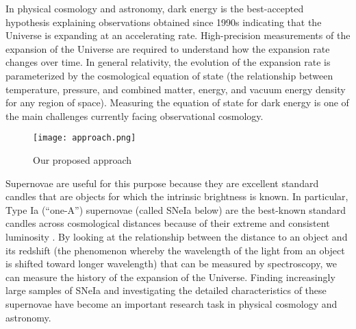\documentclass[conference,compsoc]{IEEEtran}
\begin{document}
  In physical cosmology and astronomy, %
  dark energy is the best-accepted hypothesis explaining observations obtained since 1990s indicating that the Universe is expanding at an accelerating rate.
  High-precision measurements of the expansion of the Universe are required to understand how the expansion rate changes over time.
  In general relativity, the evolution of the expansion rate is parameterized by the cosmological equation of state (the relationship between temperature, pressure, and combined matter, energy, and vacuum energy density for any region of space).
  Measuring the equation of state for dark energy is one of the main challenges currently facing observational cosmology.


 \begin{figure}[t]
  \begin{center}
    \texttt{[image: approach.png]}
  \end{center}
  \caption{Our proposed approach}
  \label{fig:approach}
\end{figure}

  Supernovae are useful for this purpose because they are excellent standard candles that are objects for which the intrinsic brightness is known.
  In particular, Type Ia (``one-A'') supernovae (called SNeIa below) are the best-known standard candles across cosmological distances because of their extreme and consistent luminosity \cite{Riess1998,Perlmutter1999}.
  By looking at the relationship between the distance to an object and its redshift (the phenomenon whereby the wavelength of the light from an object is shifted toward longer wavelength) that can be measured by spectroscopy, we can measure the history of the expansion of the Universe.
  Finding increasingly large samples of SNeIa and investigating the detailed characteristics of these supernovae have become an important research task in physical cosmology and astronomy.
\end{document}
